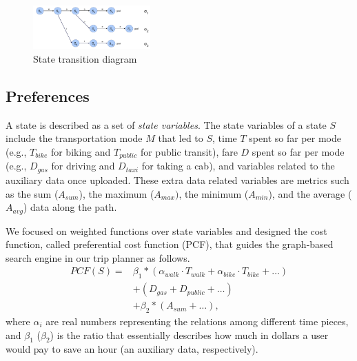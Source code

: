 \documentclass[letterpaper]{article}
\newcommand{\tit}[1]{\textit{#1}}
\newcommand{\PCF}{\mathit{PCF}}
\newcommand{\walk}{\mathit{walk}}
\newcommand{\bike}{\mathit{bike}}
\newcommand{\public}{\mathit{public}}
\newcommand{\taxi}{\mathit{taxi}}
\newcommand{\gas}{\mathit{gas}}
\newcommand{\SUM}{\mathit{sum}}
\newcommand{\MAX}{\mathit{max}}
\newcommand{\MIN}{\mathit{min}}
\newcommand{\AVG}{\mathit{avg}}
\begin{document}
\begin{figure}[!ht]
  \centering
    \includegraphics[width=0.4\textwidth]{figs/trajectories.pdf}
  \caption{State transition diagram\label{fig:trjs}}
\end{figure}


\subsection{Preferences}

A state is described as a set of \tit{state variables}.
The state variables of a state $S$ include the transportation mode $M$ that led to $S$,
time $T$ spent so far per mode (e.g., $T_\bike$ for biking and $T_\public$ for
public transit), fare $D$ spent so far per mode (e.g., $D_\gas$ for driving and
$D_\taxi$ for taking a cab), and variables related to the auxiliary data once uploaded.
These extra data related variables are metrics such as the sum ($A_\SUM$),
the maximum ($A_\MAX)$, the minimum ($A_\MIN$), and the average ($A_\AVG$) data along the path.

We focused on weighted functions over state variables and
designed the cost function, called preferential cost function (PCF), that guides the
graph-based search engine in our trip planner as follows.
\begin{equation}
	\begin{aligned}
		\PCF(S) =& \beta_1 * (\alpha_\walk \cdot T_\walk + \alpha_\bike \cdot T_\bike + \ldots) \\
								&+ (D_\gas + D_\public + \ldots) \\
								&+ \beta_2 * (A_\SUM + \ldots),
	\end{aligned}
	\label{eqt:pcf}
\end{equation}
where $\alpha_i$ are real numbers representing the relations among different time pieces,
and $\beta_1$ ($\beta_2$) is the ratio that essentially describes how much in dollars a user would pay to
save an hour (an auxiliary data, respectively).
\end{document}
